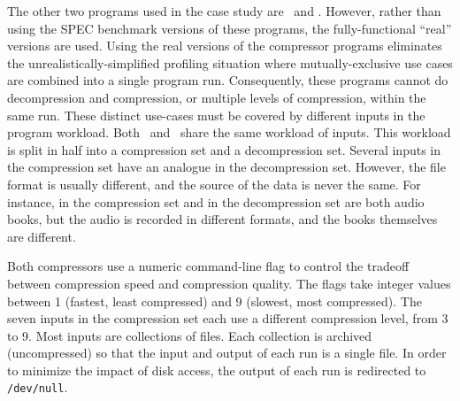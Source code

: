 The other two programs used in the case study are \bzip\ and \gzip.
However, rather than using the SPEC benchmark versions of these
programs, the fully-functional ``real'' versions are used.  Using the
real versions of the compressor programs eliminates the
unrealistically-simplified profiling situation where
mutually-exclusive use cases are combined into a single program run.
Consequently, these programs cannot do decompression and compression,
or multiple levels of compression, within the same run.  These
distinct use-cases must be covered by different inputs in the program
workload.  Both \bzip\ and \gzip\ share the same workload of inputs.
This workload is split in half into a compression set and a
decompression set.  Several inputs in the compression set have an
analogue in the decompression set.  However, the file format is
usually different, and the source of the data is never the same.  For
instance,  in the compression set
and  in the decompression set are both audio
books, but the audio is recorded in different formats, and the books
themselves are different.

Both compressors use a numeric command-line flag to control the
tradeoff between compression speed and compression quality.  The flags
take integer values between 1 (fastest, least compressed) and 9
(slowest, most compressed).  The seven inputs in the compression set
each use a different compression level, from 3 to 9.  Most inputs are
collections of files.  Each collection is archived (uncompressed) so
that the input and output of each run is a single file.  In order to
minimize the impact of disk access, the output of each run is
redirected to {\tt /dev/null}.

